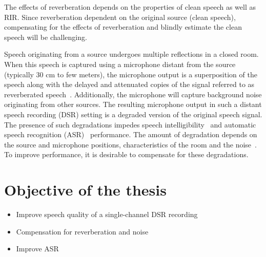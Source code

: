 The effects of reverberation depends on the properties of clean speech as well as RIR. Since reverberation dependent on the original source (clean speech), compensating for the effects of reverberation and blindly estimate the clean speech will be challenging.  

Speech originating from a source undergoes multiple reflections in a closed room. When this speech is captured using a microphone distant from the source (typically 30 cm to few meters), the microphone output is a superposition of the speech along with the delayed and attenuated copies of the signal referred to as reverberated speech~\cite{naylor2010speech}. Additionally, the microphone will capture background noise originating from other sources. The resulting microphone output in such a distant speech recording (DSR) setting is a degraded version of the original speech signal. The presence of such degradations impedes speech intelligibility~\cite{kinoshita2016summary}  and automatic speech recognition (ASR)~\cite{barker2018fifth, barker2015third} performance. The amount of degradation depends on the source and microphone positions, characteristics of the room and the noise~\cite{naylor2010speech,kinoshita2016summary}. To improve performance, it is desirable to compensate for these degradations.
\iffalse
\begin{itemize}
\item What is it ?
\item Representation using RIR
\item Differentiate reverberation from echo
\item Why it is challenging ?
\item Combined effect with noise
\end{itemize}
\fi
\section{Objective of the thesis}
\begin{itemize}
\item Improve speech quality of a single-channel DSR recording
\item Compensation for reverberation and noise
\item Improve ASR
\end{itemize}

